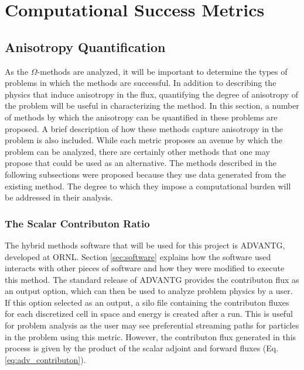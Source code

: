 \newcommand{\anglevars}{x,y,z,E_g,\theta,\varphi}
\newcommand{\scalarvars}{x,y,z,E_g}


\section{Computational Success Metrics}
\label{sec:successmetrics}
\subsection{Anisotropy Quantification}
\label{sec:anisotropy_quant}

As the $\Omega$-methods are analyzed, it will be important to determine the
types of problems in which the methods are successful. In addition to describing
the physics that induce anisotropy in the flux, quantifying the degree of
anisotropy of the problem will be useful in characterizing the method. In this
section, a number
of methods by which the anisotropy can be quantified in these problems are
proposed. A brief description of how these methods capture anisotropy in the
problem is also included. While each metric proposes an avenue by which the
problem can be analyzed, there are certainly other methods that one may propose
that could be used as an alternative. The methods described in the following
subsections were proposed because they use data generated from the existing
method. The degree to which they impose a computational burden will be addressed
in their analysis.

\subsubsection{The Scalar Contributon Ratio}

The hybrid methods software that will be used for this project is ADVANTG,
developed at ORNL. Section \ref{sec:software} explains how the software used
interacts with other pieces of software
and how they were modified to execute this method.
The standard release of ADVANTG provides the contributon flux as an output
option, which can then be used to analyze problem physics by a user.
If this option selected as an output, a silo file containing
the contributon fluxes for each discretized cell in space and energy  is
created after
a run. This is useful for problem analysis as the user may see
preferential streaming paths for particles in the problem using this metric.
However, the contributon flux generated in this process is given by the product
of the scalar adjoint and forward fluxes (Eq. \eqref{eq:adv_contributon}).

